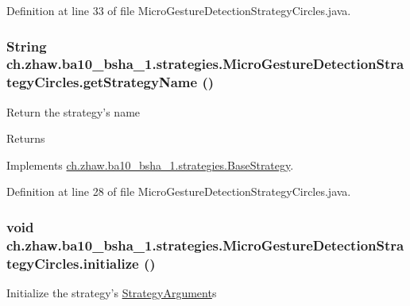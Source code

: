 Definition at line 33 of file MicroGestureDetectionStrategyCircles.java.\hypertarget{classch_1_1zhaw_1_1ba10__bsha__1_1_1strategies_1_1MicroGestureDetectionStrategyCircles_a73a3d1a9b8047909777b53094ea99f9b}{
\subsubsection[{getStrategyName}]{\setlength{\rightskip}{0pt plus 5cm}String ch.zhaw.ba10\_\-bsha\_\-1.strategies.MicroGestureDetectionStrategyCircles.getStrategyName ()}}
\label{classch_1_1zhaw_1_1ba10__bsha__1_1_1strategies_1_1MicroGestureDetectionStrategyCircles_a73a3d1a9b8047909777b53094ea99f9b}
Return the strategy's name

\begin{DoxyReturn}{Returns}

\end{DoxyReturn}


Implements \hyperlink{classch_1_1zhaw_1_1ba10__bsha__1_1_1strategies_1_1BaseStrategy_aa0ebed55eed45409bad13d43a0058780}{ch.zhaw.ba10\_\-bsha\_\-1.strategies.BaseStrategy}.

Definition at line 28 of file MicroGestureDetectionStrategyCircles.java.\hypertarget{classch_1_1zhaw_1_1ba10__bsha__1_1_1strategies_1_1MicroGestureDetectionStrategyCircles_a275de6238273284cc18163f631180be8}{
\subsubsection[{initialize}]{\setlength{\rightskip}{0pt plus 5cm}void ch.zhaw.ba10\_\-bsha\_\-1.strategies.MicroGestureDetectionStrategyCircles.initialize ()}}
\label{classch_1_1zhaw_1_1ba10__bsha__1_1_1strategies_1_1MicroGestureDetectionStrategyCircles_a275de6238273284cc18163f631180be8}
Initialize the strategy's \hyperlink{classch_1_1zhaw_1_1ba10__bsha__1_1_1StrategyArgument}{StrategyArgument}s 

